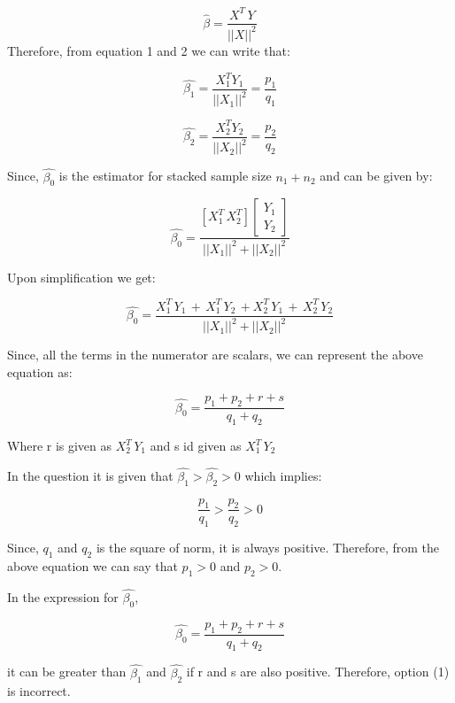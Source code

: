 \documentclass[12pt]{article}
\begin{document}
$$
\hat{\beta} = \dfrac{X^T\,Y}{||X||^2}
$$
\clearpage
\noindent Therefore, from equation 1 and 2 we can write that:

\begin{equation}
\hat{\beta_1} = \dfrac{X_1^T Y_1}{||X_1||^2} = \dfrac{p_1}{q_1}
\end{equation}

\begin{equation}
\hat{\beta_2} = \dfrac{X_2^T Y_2}{||X_2||^2} = \dfrac{p_2}{q_2}
\end{equation}

\noindent Since, $\hat{\beta_0}$ is the estimator for stacked sample size $n_1+n_2$ and can be given by:

\begin{equation}
\hat{\beta_0} = \dfrac{[X_1^T\, X_2^T] \begin{bmatrix} Y_1\\Y_2 \end{bmatrix}}{||X_1||^2 + ||X_2||^2}
\end{equation}

\noindent Upon simplification we get:

\begin{equation}
\hat{\beta_0} = \dfrac{{}X_1^T\,Y_1\, + \, X_1^T\,Y_2 \, + X_2^T\,Y_1 \, + \, X_2^T\, Y_2}{||X_1||^2 + ||X_2||^2}
\end{equation}

\vspace{3mm}
\noindent Since, all the terms in the numerator are scalars, we can represent the above equation as:

$$
\hat{\beta_0} = \dfrac{p_1 + p_2 + r + s}{q_1 + q_2}
$$

\noindent Where r is given as $X_2^T\,Y_1$ and s id given as $X_1^T\,Y_2$

\noindent In the question it is given that $\hat{\beta_1} > \hat{\beta_2} > 0$ which implies:
\vspace{4mm}

$$
\dfrac{p_1}{q_1} > \dfrac{p_2}{q_2} > 0
$$
\vspace{2mm}

\noindent Since, $q_1$ and $q_2$ is the square of norm, it is always positive. Therefore, from the above equation we can say that $p_1>0$ and $p_2>0$.

\noindent In the expression for $\hat{\beta_0}$,

$$
\hat{\beta_0} = \dfrac{p_1 + p_2 + r + s}{q_1 + q_2}
$$

\noindent it can be greater than $\hat{\beta_1}$ and $\hat{\beta_2}$ if r and s are also positive. Therefore, option (1) is incorrect.
\end{document}
